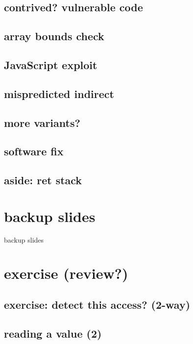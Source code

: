 \subsection{contrived? vulnerable code}


\subsection{array bounds check}


\subsection{JavaScript exploit}


\subsection{mispredicted indirect}


\subsection{more variants?}


\subsection{software fix}


\subsection{aside: ret stack}



\section{backup slides}
\begin{frame}{backup slides}
\end{frame}

\section{exercise (review?)}
\subsection{exercise: detect this access? (2-way)}


\subsection{reading a value (2)}



